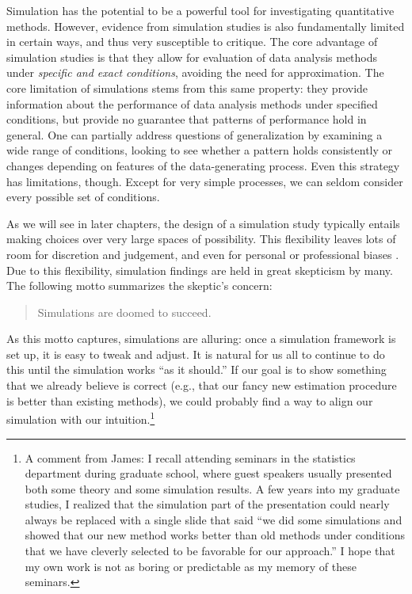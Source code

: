 \documentclass[
]{book}
\begin{document}
Simulation has the potential to be a powerful tool for investigating quantitative methods.
However, evidence from simulation studies is also fundamentally limited in certain ways, and thus very susceptible to critique.
The core advantage of simulation studies is that they allow for evaluation of data analysis methods under \emph{specific and exact conditions}, avoiding the need for approximation.
The core limitation of simulations stems from this same property: they provide information about the performance of data analysis methods under specified conditions, but provide no guarantee that patterns of performance hold in general.
One can partially address questions of generalization by examining a wide range of conditions, looking to see whether a pattern holds consistently or changes depending on features of the data-generating process.
Even this strategy has limitations, though.
Except for very simple processes, we can seldom consider every possible set of conditions.

As we will see in later chapters, the design of a simulation study typically entails making choices over very large spaces of possibility.
This flexibility leaves lots of room for discretion and judgement, and even for personal or professional biases \citep{boulesteix2020Replication}.
Due to this flexibility, simulation findings are held in great skepticism by many.
The following motto summarizes the skeptic's concern:

\begin{quote}
Simulations are doomed to succeed.
\end{quote}

As this motto captures, simulations are alluring: once a simulation framework is set up, it is easy to tweak and adjust.
It is natural for us all to continue to do this until the simulation works ``as it should.''
If our goal is to show something that we already believe is correct (e.g., that our fancy new estimation procedure is better than existing methods), we could probably find a way to align our simulation with our intuition.\footnote{A comment from James: I recall attending seminars in the statistics department during graduate school, where guest speakers usually presented both some theory and some simulation results. A few years into my graduate studies, I realized that the simulation part of the presentation could nearly always be replaced with a single slide that said ``we did some simulations and showed that our new method works better than old methods under conditions that we have cleverly selected to be favorable for our approach.'' I hope that my own work is not as boring or predictable as my memory of these seminars.}
\end{document}
